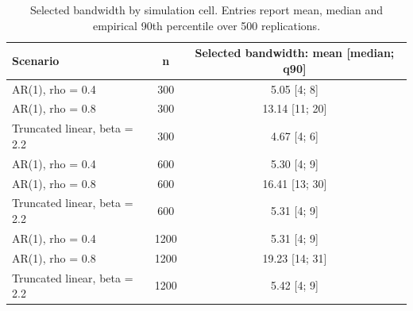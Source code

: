 \begin{table}[!htbp]
\small
\centering
\caption{Selected bandwidth by simulation cell. Entries report mean, median and empirical 90th percentile over 500 replications.}
\label{tab:selected-bandwidth}
\begin{tabular}{lcc}
\toprule
Scenario & n & Selected bandwidth: mean [median; q90] \\
\midrule
AR(1), rho = 0.4 & 300 & 5.05 [4; 8] \\
AR(1), rho = 0.8 & 300 & 13.14 [11; 20] \\
Truncated linear, beta = 2.2 & 300 & 4.67 [4; 6] \\
AR(1), rho = 0.4 & 600 & 5.30 [4; 9] \\
AR(1), rho = 0.8 & 600 & 16.41 [13; 30] \\
Truncated linear, beta = 2.2 & 600 & 5.31 [4; 9] \\
AR(1), rho = 0.4 & 1200 & 5.31 [4; 9] \\
AR(1), rho = 0.8 & 1200 & 19.23 [14; 31] \\
Truncated linear, beta = 2.2 & 1200 & 5.42 [4; 9] \\
\bottomrule
\end{tabular}
\end{table}
